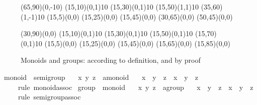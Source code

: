 \begin{isabellebody}
\begin{isamarkuptext}
 \begin{figure}[htbp]
   \begin{center}
     \small
     \unitlength 0.6mm
     \begin{picture}(65,90)(0,-10)
       \put(15,10){\line(0,1){10}} \put(15,30){\line(0,1){10}}
       \put(15,50){\line(1,1){10}} \put(35,60){\line(1,-1){10}}
       \put(15,5){\makebox(0,0){}}
       \put(15,25){\makebox(0,0){}}
       \put(15,45){\makebox(0,0){}}
       \put(30,65){\makebox(0,0){}} \put(50,45){\makebox(0,0){}}
     \end{picture}
     \hspace{4em}
     \begin{picture}(30,90)(0,0)
       \put(15,10){\line(0,1){10}} \put(15,30){\line(0,1){10}}
       \put(15,50){\line(0,1){10}} \put(15,70){\line(0,1){10}}
       \put(15,5){\makebox(0,0){}}
       \put(15,25){\makebox(0,0){}}
       \put(15,45){\makebox(0,0){}}
       \put(15,65){\makebox(0,0){}}
       \put(15,85){\makebox(0,0){}}
     \end{picture}
     \caption{Monoids and groups: according to definition, and by proof}
     \label{fig:monoid-group}
   \end{center}
 \end{figure}%
\end{isamarkuptext}%
\ monoid\ {\isasymsubseteq}\ semigroup\isanewline
{}\isanewline
\ \ \ x\ y\ z\ {\isacharcolon}{\isacharcolon}\ {\isachardoublequote}{\isacharprime}a{\isasymColon}monoid{\isachardoublequote}\isanewline
\ \ \ {\isachardoublequote}x\ {\isasymodot}\ y\ {\isasymodot}\ z\ {\isacharequal}\ x\ {\isasymodot}\ {\isacharparenleft}y\ {\isasymodot}\ z{\isacharparenright}{\isachardoublequote}\isanewline
\ \ \ \ \ {\isacharparenleft}rule\ monoid{\isachardot}assoc{\isacharparenright}\isanewline
{}\isanewline
\isanewline
{}\ group\ {\isasymsubseteq}\ monoid\isanewline
{}\isanewline
\ \ \ x\ y\ z\ {\isacharcolon}{\isacharcolon}\ {\isachardoublequote}{\isacharprime}a{\isasymColon}group{\isachardoublequote}\isanewline
\ \ \ {\isachardoublequote}x\ {\isasymodot}\ y\ {\isasymodot}\ z\ {\isacharequal}\ x\ {\isasymodot}\ {\isacharparenleft}y\ {\isasymodot}\ z{\isacharparenright}{\isachardoublequote}\isanewline
\ \ \ \ \ {\isacharparenleft}rule\ semigroup{\isachardot}assoc{\isacharparenright}\isanewline

\end{isabellebody}

